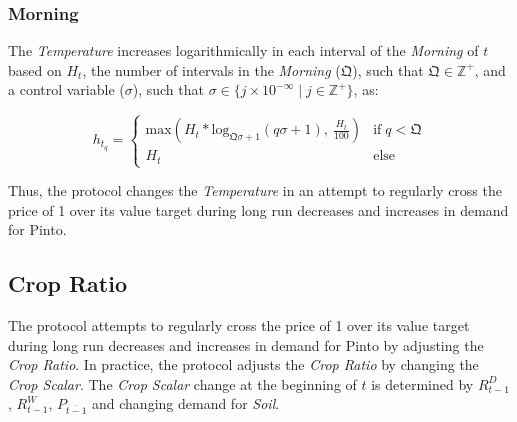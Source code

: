 \documentclass[tikz]{article}
\newcommand{\term}[1]{\textsl{#1}}
\newcommand{\Pinto}{} %
\renewcommand{\Pinto}{\usebox{\cachePinto}}
\begin{document}

\subsubsection{Morning}
\vspace{-0.025cm}

The \term{Temperature} increases logarithmically in each interval of the \term{Morning} of $t$ based on $H_{t}$, the number of intervals in the \term{Morning} ($\mathfrak{Q}$), such that $\mathfrak{Q} \in \mathbb{Z}^{+}$, and a control variable ($\sigma$), such that $\sigma \in \{j \times 10^{-\infty} \mid j \in \mathbb{Z}^{+} \}$, as:

\vspace{-0.025cm}

    $$ 
        h_{t_{q}} =
            \begin{cases}
                \text{max}(
                        H_{t}*\text{log}_{\mathfrak{Q}\sigma + 1}(q\sigma + 1),\ 
                        \frac{H_{t}}{100})
                    & \text{if} \; q < \mathfrak{Q} \\
                    
                H_{t} 
                    & \text{else}
            \end{cases} 
    $$

\vspace{-0.025cm}

Thus, the protocol changes the \term{Temperature} in an attempt to regularly cross the price of \Pinto1 over its value target during long run decreases and increases in demand for Pinto.


\vspace{-0.025cm}
\subsection{Crop Ratio}
\vspace{-0.025cm}

The protocol attempts to regularly cross the price of \Pinto1 over its value target during long run decreases and increases in demand for Pinto by adjusting the \term{Crop Ratio}. In practice, the protocol adjusts the \term{Crop Ratio} by changing the \term{Crop Scalar}. The \term{Crop Scalar} change at the beginning of $t$ is determined by $R_{t-1}^{D}$, $R_{t-1}^{W}$, $P_{\overline{t-1}}$ and changing demand for \term{Soil}. 
\end{document}
